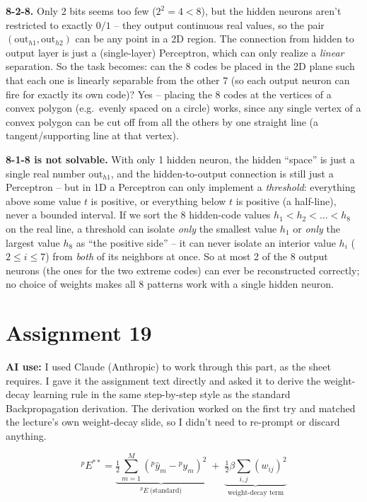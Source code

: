 \documentclass[11pt,a4paper]{article}
\begin{document}
\textbf{8-2-8.} Only 2 bits seems too few ($2^2=4<8$), but the hidden neurons aren't restricted to
exactly $0/1$ -- they output continuous real values, so the pair $(\mathrm{out}_{h1},\mathrm{out}_{h2})$
can be any point in a 2D region. The connection from hidden to output layer is just a (single-layer)
Perceptron, which can only realize a \emph{linear} separation. So the task becomes: can the 8 codes
be placed in the 2D plane such that each one is linearly separable from the other 7 (so each output
neuron can fire for exactly its own code)? Yes -- placing the 8 codes at the vertices of a convex
polygon (e.g.\ evenly spaced on a circle) works, since any single vertex of a convex polygon can be
cut off from all the others by one straight line (a tangent/supporting line at that vertex).

\textbf{8-1-8 is not solvable.} With only 1 hidden neuron, the hidden ``space'' is just a single real
number $\mathrm{out}_{h1}$, and the hidden-to-output connection is still just a Perceptron -- but in 1D
a Perceptron can only implement a \emph{threshold}: everything above some value $t$ is positive, or
everything below $t$ is positive (a half-line), never a bounded interval. If we sort the 8
hidden-code values $h_1<h_2<\dots<h_8$ on the real line, a threshold can isolate \emph{only} the
smallest value $h_1$ or \emph{only} the largest value $h_8$ as ``the positive side'' -- it can never
isolate an interior value $h_i$ ($2\le i\le7$) from \emph{both} of its neighbors at once. So at most 2
of the 8 output neurons (the ones for the two extreme codes) can ever be reconstructed correctly; no
choice of weights makes all 8 patterns work with a single hidden neuron.

\section*{Assignment 19}

\textbf{AI use:} I used Claude (Anthropic) to work through this part, as the sheet requires. I gave
it the assignment text directly and asked it to derive the weight-decay learning rule in the same
step-by-step style as the standard Backpropagation derivation. The derivation worked on the first
try and matched the lecture's own weight-decay slide, so I didn't need to re-prompt or discard
anything.

\[
  {}^pE^{**} = \underbrace{\tfrac12\sum_{m=1}^{M}\left({}^p\hat y_m-{}^py_m\right)^2}_{{}^pE\ \text{(standard)}}
  \;+\; \underbrace{\tfrac12\beta\sum_{i,j}(w_{ij})^2}_{\text{weight-decay term}}
\]
\end{document}
